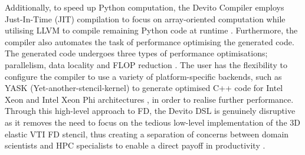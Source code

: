 Additionally, to speed up Python computation, the Devito Compiler employs Just-In-Time (JIT) compilation to focus on array-oriented computation while utilising LLVM to compile remaining Python code at runtime \cite{lange2016devito}. Furthermore, the compiler also automates the task of performance optimising the generated code. The generated code undergoes three types of performance optimisations; parallelism, data locality and FLOP reduction \cite{luporini2018architecture, louboutin2020scaling}. The user has the flexibility to configure the compiler to use a variety of platform-specific backends, such as YASK (Yet-another-stencil-kernel) to generate optimised C++ code for Intel Xeon and Intel Xeon Phi architectures \cite{luporini2018architecture}, in order to realise further performance. Through this high-level approach to FD, the Devito DSL is genuinely disruptive as it removes the need to focus on the tedious low-level implementation of the 3D elastic VTI FD stencil, thus creating a separation of concerns between domain scientists and HPC specialists to enable a direct payoff in productivity \cite{lange2016devito}.



